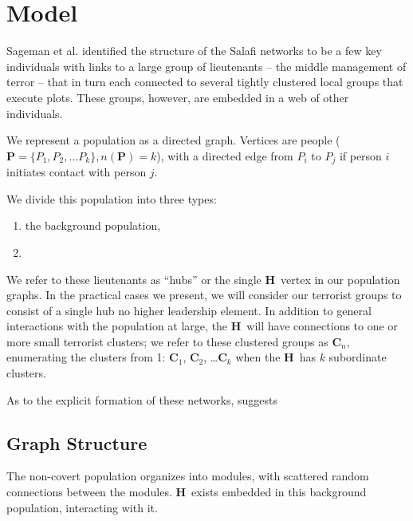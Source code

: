 \documentclass{article}
\newcommand{\Hub}[0]{\ensuremath{\mathbf{H}}}
\newcommand{\C}[1]{\ensuremath{\mathbf{C}_{#1}}}
\begin{document}
\section*{Model}
Sageman et al. identified the structure of the Salafi networks to be a few key individuals with links to a large group of lieutenants -- the middle management of terror -- that in turn each connected to several tightly clustered local groups that execute plots.  These groups, however, are embedded in a web of other individuals.

We represent a population as a directed graph.  Vertices are people ($\mathbf{P}=\{P_1, P_2, \ldots P_k\}, n(\mathbf{P})=k$), with a directed edge from $P_i$ to $P_j$ if person $i$ initiates contact with person $j$.

We divide this population into three types:
\begin{enumerate}
\item the background population,
\item 
\end{enumerate}


We refer to these lieutenants as ``hubs'' or the single \Hub\ vertex in our population graphs.  In the practical cases we present, we will consider our terrorist groups to consist of a single hub no higher leadership element.  In addition to general interactions with the population at large, the \Hub\ will have connections to one or more small terrorist clusters; we refer to these clustered groups as \C{n}, enumerating the clusters from 1: \C{1}, \C{2}, \ldots \C{k} when the \Hub\ has $k$ subordinate clusters.

As to the explicit formation of these networks, \cite{sageman} suggests

\subsection*{Graph Structure}

The non-covert population organizes into modules, with scattered random connections between the modules.  \Hub\ exists embedded in this background population, interacting with it.
\end{document}
